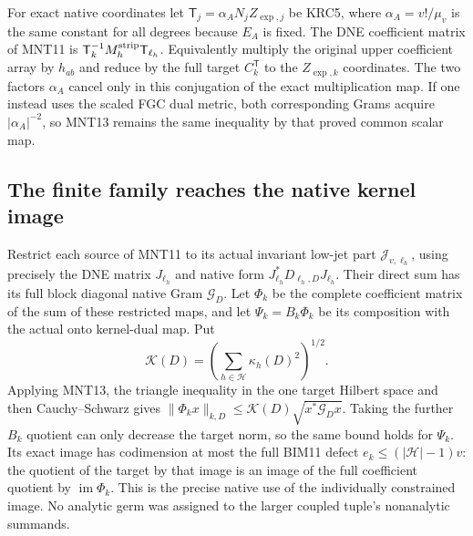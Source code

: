 \documentclass[11pt,a4paper]{article}
\begin{document}
For exact native coordinates let
$\mathsf T_j=\alpha_A N_jZ_{\exp,j}$ be KRC5,
where $\alpha_A=v!/\mu_v$ is the same constant for
all degrees because $E_A$ is fixed.
The DNE coefficient matrix of MNT11 is
$\mathsf T_k^{-1}M_h^{\rm strip}\mathsf T_{\ell_h}$.
Equivalently multiply the original upper coefficient
array by $h_{ab}$ and reduce by the full target
$C_k^{\mathsf T}$ to the $Z_{\exp,k}$ coordinates.
The two factors $\alpha_A$ cancel only in this
conjugation of the exact multiplication map.
If one instead uses the scaled FGC dual metric,
both corresponding Grams acquire $|\alpha_A|^{-2}$,
so MNT13 remains the same inequality by that proved
common scalar map.

\subsection{The finite family reaches the native kernel image}

Restrict each source of MNT11 to its actual invariant
low-jet part $\mathscr J_{v,\ell_h}$, using precisely
the DNE matrix $J_{\ell_h}$ and native form
$J_{\ell_h}^*D_{\ell_h,D}J_{\ell_h}$.
Their direct sum has its full block diagonal native
Gram $\mathcal G_D$.
Let $\Phi_k$ be the complete coefficient matrix
of the sum of these restricted maps, and let
$\Psi_k=B_k\Phi_k$ be its composition with the actual
onto kernel-dual map. Put
\[
 \mathcal K(D)=\left(\sum_{h\in\mathcal H}\kappa_h(D)^2\right)^{1/2}.
 \tag{MNT14}
\]
Applying MNT13, the triangle inequality in the one
target Hilbert space and then Cauchy--Schwarz gives
$\|\Phi_kx\|_{k,D}\le\mathcal K(D)\sqrt{x^*\mathcal G_Dx}$.
Taking the further $B_k$ quotient can only decrease
the target norm, so the same bound holds for $\Psi_k$.
Its exact image has codimension at most the full
BIM11 defect $e_k\le(|\mathcal H|-1)v$:
the quotient of the target by that image is an image
of the full coefficient quotient by $\operatorname{im}\Phi_k$.
This is the precise native use of the individually
constrained image. No analytic germ was assigned to
the larger coupled tuple's nonanalytic summands.
\end{document}
